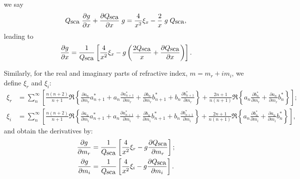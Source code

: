 \documentclass[a4paper,10pt]{article}
\def \Qsca { {Q_{\mbox{\rm sca}}}}
\def \asym { {g} }
\begin{document}
we say
\begin{align}
 \Qsca \; \frac{\partial \asym}{\partial x} + \frac{\partial \Qsca}{\partial x}\;\asym = \frac{4}{x^2} \xi_x - \frac{2}{x}\;\asym\;\Qsca,
\end{align}
leading to
\begin{align}
\frac{\partial \asym}{\partial x} = 
                 \frac{1}{\Qsca}\left[ \frac{4}{x^2} \xi_x - \asym\left(\frac{2\Qsca}{x} + \frac{\partial \Qsca}{\partial x}\right)\right].\label{eq:dgdx}
\end{align}




Similarly, for the real and imaginary parts of refractive index, $m=m_r + i m_i$, we define $\xi_r$ and $\xi_i$:
\begin{align}
 \xi_r &= \sum_n^\infty \left[  \frac{n(n+2)}{n+1} \Re \left\{ 
                                                                \frac{\partial a_n}{\partial m_r} a^*_{n+1} + 
                                                                a_n \frac{\partial a^*_{n+1}}{\partial m_r}  +
                                                                \frac{\partial b_n}{\partial m_r} b^*_{n+1}  + 
                                                                b_n \frac{\partial b^*_{n+1}}{\partial m_r}
                                                       \right\}
                               + \frac{2n+1}{n(n+1)} \Re \left\{ a_n \frac{\partial b^*_n}{\partial m_r} + 
                                    \frac{\partial a_n}{\partial m_r} b^*_n  \right\}\right];\\
 \xi_i &= \sum_n^\infty \left[  \frac{n(n+2)}{n+1} \Re \left\{ 
                                                                \frac{\partial a_n}{\partial m_i} a^*_{n+1} + 
                                                                a_n \frac{\partial a^*_{n+1}}{\partial m_i}  +
                                                                \frac{\partial b_n}{\partial m_i} b^*_{n+1}  + 
                                                                b_n \frac{\partial b^*_{n+1}}{\partial m_i}
                                                       \right\}
                               + \frac{2n+1}{n(n+1)} \Re \left\{ a_n \frac{\partial b^*_n}{\partial m_i} + 
                                    \frac{\partial a_n}{\partial m_i} b^*_n  \right\}\right],
\end{align}
and obtain the derivatives by:
\begin{align}
 \frac{\partial \asym}{\partial m_r} &= \frac{1}{\Qsca} \left[ \frac{4}{x^2} \xi_r - \asym \frac{\partial \Qsca}{\partial m_r} \right];\label{eq:dgdn}\\
 \frac{\partial \asym}{\partial m_i} &= \frac{1}{\Qsca} \left[ \frac{4}{x^2} \xi_i - \asym \frac{\partial \Qsca}{\partial m_i} \right]. \label{eq:dgdk}
\end{align}
\end{document}
